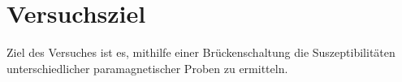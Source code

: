 \section{Versuchsziel}
\label{sec:versuchsziel}

Ziel des Versuches ist es, mithilfe einer Brückenschaltung die Suszeptibilitäten unterschiedlicher paramagnetischer Proben zu ermitteln.